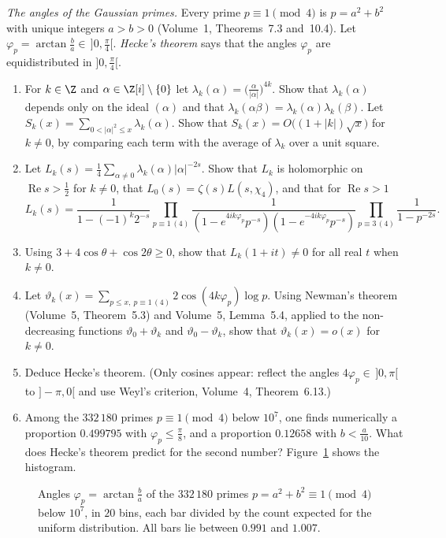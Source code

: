 \begin{exercise}[Journey]\label{pb:hecke}
\emph{The angles of the Gaussian primes.} Every prime $p\equiv1\pmod4$ is $p=a^2+b^2$ with unique integers $a>b>0$ (Volume~1, Theorems~7.3 and~10.4). Let
$\varphi_p=\arctan\frac ba\in\,]0,\frac\pi4[$. \emph{Hecke's theorem} says that the angles $\varphi_p$ are equidistributed in $]0,\frac\pi4[$.
\begin{enumerate}[label=(\alph*)]
\item For $k\in\Z$ and $\alpha\in\Z[i]\setminus\{0\}$ let $\lambda_k(\alpha)=\bigl(\frac\alpha{|\alpha|}\bigr)^{4k}$. Show that $\lambda_k(\alpha)$ depends only on the ideal
$(\alpha)$ and that $\lambda_k(\alpha\beta)=\lambda_k(\alpha)\lambda_k(\beta)$. Let $S_k(x)=\sum_{0<|\alpha|^2\le x}\lambda_k(\alpha)$. Show that $S_k(x)=O\bigl((1+|k|)\sqrt x\bigr)$
for $k\ne0$, by comparing each term with the average of $\lambda_k$ over a unit square.
\item Let $L_k(s)=\frac14\sum_{\alpha\ne0}\lambda_k(\alpha)|\alpha|^{-2s}$. Show that $L_k$ is holomorphic on $\operatorname{Re}s>\frac12$ for $k\ne0$, that
$L_0(s)=\zeta(s)L(s,\chi_4)$, and that for $\operatorname{Re}s>1$
\[
L_k(s)=\frac1{1-(-1)^k2^{-s}}\prod_{p\equiv1\,(4)}\frac1{(1-e^{4ik\varphi_p}p^{-s})(1-e^{-4ik\varphi_p}p^{-s})}\prod_{p\equiv3\,(4)}\frac1{1-p^{-2s}}.
\]
\item Using $3+4\cos\theta+\cos2\theta\ge0$, show that $L_k(1+it)\ne0$ for all real $t$ when $k\ne0$.
\item Let $\vartheta_k(x)=\sum_{p\le x,\ p\equiv1\,(4)}2\cos(4k\varphi_p)\log p$. Using Newman's theorem (Volume~5, Theorem~5.3) and Volume~5, Lemma~5.4, applied to the
non-decreasing functions $\vartheta_0+\vartheta_k$ and $\vartheta_0-\vartheta_k$, show that $\vartheta_k(x)=o(x)$ for $k\ne0$.
\item Deduce Hecke's theorem. (Only cosines appear: reflect the angles $4\varphi_p\in\,]0,\pi[$ to $]-\pi,0[$ and use Weyl's criterion, Volume~4, Theorem~6.13.)
\item Among the $332\,180$ primes $p\equiv1\pmod4$ below $10^7$, one finds numerically a proportion $0.499795$ with $\varphi_p\le\frac\pi8$, and a proportion $0.12658$
with $b<\frac a{10}$. What does Hecke's theorem predict for the second number? Figure~\ref{fig:angles} shows the histogram.
\end{enumerate}
\end{exercise}

\begin{figure}[ht]
\centering
{}
\caption{Angles $\varphi_p=\arctan\frac ba$ of the $332\,180$ primes $p=a^2+b^2\equiv1\pmod4$ below $10^7$, in $20$ bins, each bar divided by the count expected for the
uniform distribution. All bars lie between $0.991$ and $1.007$.}\label{fig:angles}
\end{figure}

